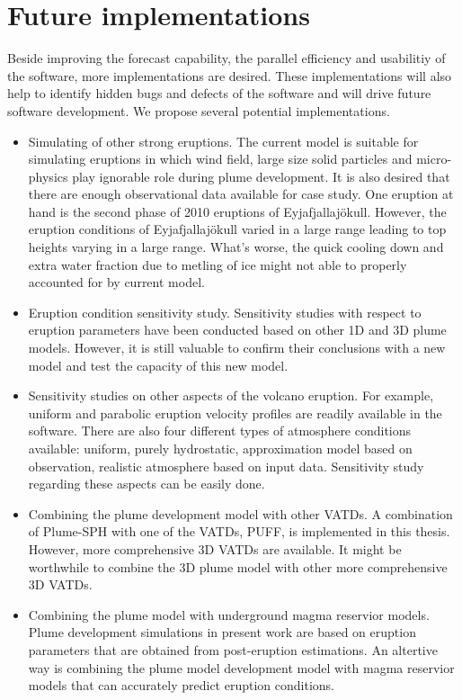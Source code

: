 \section{Future implementations}
Beside improving the forecast capability, the parallel efficiency and usabilitiy of the software, more implementations are desired. These implementations will also help to identify hidden bugs and defects of the software and will drive future software development.
We propose several potential implementations.
\begin{itemize}
\item {Simulating of other strong eruptions. The current model is suitable for simulating eruptions in which wind field, large size solid particles and micro-physics play ignorable role during plume development. It is also desired that there are enough observational data available for case study. One eruption at hand is the second phase of 2010 eruptions of Eyjafjallajökull. However, the eruption conditions of Eyjafjallajökull varied in a large range leading to top heights varying in a large range. What's worse, the quick cooling down and extra water fraction due to metling of ice might not able to properly accounted for by current model.}
\item {Eruption condition sensitivity study. Sensitivity studies with respect to eruption parameters have been conducted based on other 1D and 3D plume models. However, it is still valuable to confirm their conclusions with a new model and test the capacity of this new model.}
\item {Sensitivity studies on other aspects of the volcano eruption. For example, uniform and parabolic eruption velocity profiles are readily available in the software. There are also four different types of atmosphere conditions available: uniform, purely hydrostatic, approximation model based on observation, realistic atmosphere based on input data. Sensitivity study regarding these aspects can be easily done.}
\item {Combining the plume development model with other VATDs. A combination of Plume-SPH with one of the VATDs, PUFF, is implemented in this thesis. However, more comprehensive 3D VATDs are available. It might be worthwhile to combine the 3D plume model with other more comprehensive 3D VATDs.}
\item {Combining the plume model with underground magma reservior models. Plume development simulations in present work are based on eruption parameters that are obtained from post-eruption estimations. An altertive way is combining the plume model development model with magma reservior models that can accurately predict eruption conditions.}

\end{itemize}
